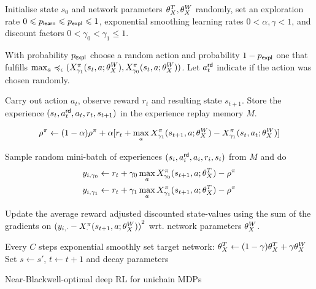 \documentclass[envcountsame]{llncs}
\begin{document}
\begin{algorithm}[t!]
  \begin{algorithmic}[1]
    \State{}Initialise state \(s_{0}\) and network parameters \(\theta_X^{T}, \theta_X^{W}\) randomly, set
    an exploration rate \(0 \leqslant p_{\mathsf{learn}} \leqslant p_{\mathsf{expl}} \leqslant 1\), exponential smoothing learning rates
    \(0 < \alpha, \gamma < 1\), and discount factors
    \(0 < \gamma_{0} < \gamma_{1} \leqslant 1\).
    \State{}\begin{minipage}[t]{0.9\textwidth} With probability \(p_{\mathsf{expl}}\) choose a random action and
      probability \(1-p_{\mathsf{expl}}\) one that fulfills
      \(\max_{a}\preccurlyeq_{\epsilon}(X^{\pi}_{\gamma_{1}}(s_{t},a; \theta_X^{W}{}),X^\pi_ {\gamma_{0}}(s_{t},a; \theta_X^{W}{}))\). Let
      \(a_{t}^{\mathsf{rd}}\) indicate if the action was chosen randomly.
    \end{minipage}
    \State{}\begin{minipage}[t]{0.9\textwidth}
    Carry out action \(a_{t}\), observe reward \(r_{t}\) and resulting state \(s_{t+1}\).
    Store the experience \((s_{t}, a_{t}^{\mathsf{rd}}, a_{t}, r_{t}, s_{t+1})\) in the experience replay
    memory \(M\).
    \end{minipage}
    \begin{align*}
      \rho^{\pi}  \gets (1- \alpha) \rho^{\pi} + \alpha [r_{t} +
      \max_{a}X^\pi_{\gamma_1}(s_{t+1},a; \theta_X^{W}{}) - X^\pi_{\gamma_1}(s_{t},a_{t}; \theta_X^{W}{})]
    \end{align*}
    \EndIf

    \State{}Sample random mini-batch of experiences \((s_{i}, a_{i}^{\mathsf{rd}}, a_{i}, r_{i}, s_{i})\)
    from \(M\) and do
    \begin{align*}
      y_{i,\gamma_0} & \gets r_{t} + \gamma_{0} \max_{a}
                                        X^\pi_{\gamma_0}(s_{t+1},a; \theta_X^{T}{}) - \rho^{\pi} \\
      y_{i,\gamma_{1}} & \gets r_{t} + \gamma_{1} \max_{a}
                                        X^\pi_{\gamma_1}(s_{t+1},a; \theta_X^{T}{}) - \rho^{\pi}
    \end{align*}
    \State{} \begin{minipage}[t]{0.9\textwidth} Update the average reward adjusted discounted
      state-values using the sum of the gradients on \({(y_{i,\cdot} -
      X^\pi_{\cdot}(s_{t+1},a; \theta_X^{W}{}))}^{2}\) wrt. network parameters
    \(\theta_X^{W}{}\).
    \end{minipage}
    \State{} Every \(C\) steps exponential smoothly set target network:
      \(\theta_X^{T} \gets (1 - \gamma) \theta_X^{T}{} + \gamma \theta_X^{W}{}\)
    \State{} Set \(s \gets s'\), \(t \gets t+1\) and decay parameters
    \EndWhile{}
  \end{algorithmic}
  \caption{\label{alg:near}Near-Blackwell-optimal deep RL for unichain MDPs}
\end{algorithm}
\end{document}
